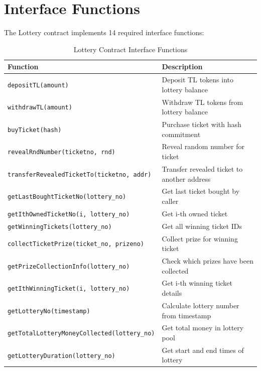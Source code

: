 \documentclass[12pt,a4paper]{article}
\begin{document}
\section{Interface Functions}

The Lottery contract implements 14 required interface functions:

\begin{table}[H]
    \centering
    \small
    \begin{tabular}{@{}p{9cm}p{8cm}@{}}
        \toprule
        \textbf{Function} & \textbf{Description} \\
        \midrule
        \texttt{depositTL(amount)} & Deposit TL tokens into lottery balance \\
        \texttt{withdrawTL(amount)} & Withdraw TL tokens from lottery balance \\
        \texttt{buyTicket(hash)} & Purchase ticket with hash commitment \\
        \texttt{revealRndNumber(ticketno, rnd)} & Reveal random number for ticket \\
        \texttt{transferRevealedTicketTo(ticketno, addr)} & Transfer revealed ticket to another address \\
        \texttt{getLastBoughtTicketNo(lottery\_no)} & Get last ticket bought by caller \\
        \texttt{getIthOwnedTicketNo(i, lottery\_no)} & Get i-th owned ticket \\
        \texttt{getWinningTickets(lottery\_no)} & Get all winning ticket IDs \\
        \texttt{collectTicketPrize(ticket\_no, prizeno)} & Collect prize for winning ticket \\
        \texttt{getPrizeCollectionInfo(lottery\_no)} & Check which prizes have been collected \\
        \texttt{getIthWinningTicket(i, lottery\_no)} & Get i-th winning ticket details \\
        \texttt{getLotteryNo(timestamp)} & Calculate lottery number from timestamp \\
        \texttt{getTotalLotteryMoneyCollected(lottery\_no)} & Get total money in lottery pool \\
        \texttt{getLotteryDuration(lottery\_no)} & Get start and end times of lottery \\
        \bottomrule
    \end{tabular}
    \caption{Lottery Contract Interface Functions}
    \label{tab:functions}
\end{table}
\end{document}
